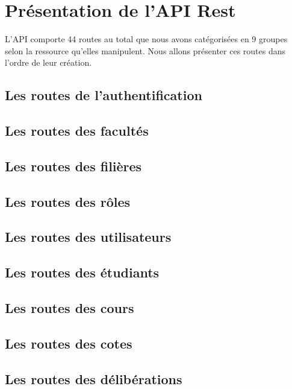 \section{Présentation de l'API Rest}\label{sec:presentation-de-l-api}
    L'API comporte 44 routes au total que nous avons catégorisées en 9 groupes
    selon la ressource qu'elles manipulent. Nous allons présenter ces routes
    dans l'ordre de leur création.

    \subsection{Les routes de l'authentification}\label{subsec:routes-auth}
    

    \subsection{Les routes des facultés}\label{subsec:routes-fac}
    

    \subsection{Les routes des filières}\label{subsec:routes-field}
    

    \subsection{Les routes des r\^oles}\label{subsec:routes-role}
    

    \subsection{Les routes des utilisateurs}\label{subsec:routes-user}
    

    \subsection{Les routes des étudiants}\label{subsec:routes-student}
    

    \subsection{Les routes des cours}\label{subsec:routes-course}
    

    \subsection{Les routes des cotes}\label{subsec:routes-grade}
    

    \subsection{Les routes des délibérations}\label{subsec:routes-deliberation}
    

